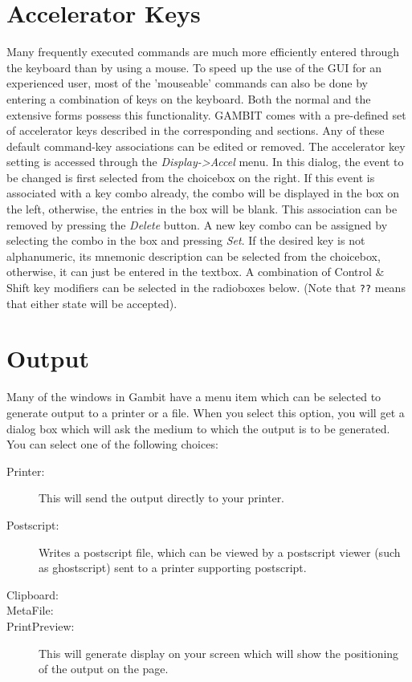 \section{Accelerator Keys}\label{Accelerators}

Many frequently executed commands are much more efficiently entered
through the keyboard than by using a mouse.  To speed up the use of the
GUI for an experienced user, most of the 'mouseable' commands can also be
done by entering a combination of keys on the keyboard.  Both the normal
and the extensive forms possess this functionality.  GAMBIT comes with a
pre-defined set of accelerator keys described in the corresponding 
 and 
 sections.  Any of these default command-key
associations can be edited or removed.  The accelerator key setting is
accessed through the {\em Display->Accel} menu.  In this dialog, the event
to be changed is first selected from the choicebox on the right.  If this
event is associated with a key combo already, the combo will be displayed
in the box on the left, otherwise, the entries in the box will be blank.
This association can be removed by pressing the {\em Delete} button.  A
new key combo can be assigned by selecting the combo in the box and
pressing {\em Set}.  If the desired key is not alphanumeric, its mnemonic
description can be selected from the choicebox, otherwise, it can just be
entered in the textbox.  A combination of Control \& Shift key modifiers
can be selected in the radioboxes below.  (Note that \verb+??+  means that either
state will be accepted).

\section{Output}\label{outputsec}
Many of the windows in Gambit have a menu item which can be 
selected to generate output to a printer or a file.  When you select this 
option, you will get a dialog box which will ask the medium to which the 
output is to be generated.  You can select one of the following 
choices:
\begin{description}
\item[Printer:] This will send the output directly to your printer. 
\item[Postscript:] Writes a postscript file, which can be viewed by a 
postscript viewer (such as ghostscript) sent to a printer 
supporting postscript.  
\item[Clipboard:] 
\item[MetaFile:]
\item[PrintPreview:]  This will generate display on your screen which will 
show the positioning of the output on the page.   
\end{description}

